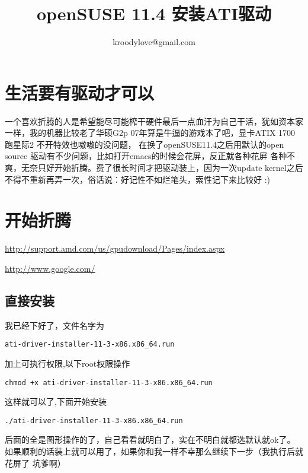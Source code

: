 \documentclass[adobefonts]{ctexart}
\title{\textbf{openSUSE 11.4 安装ATI驱动}}
\author{kroodylove@gmail.com}
\begin{document}
\maketitle
\tableofcontents

\newpage
\section{生活要有驱动才可以}
一个喜欢折腾的人是希望能尽可能榨干硬件最后一点血汗为自己干活，犹如资本家一样，我的机器比较老了华硕G2p 07年算是牛逼的游戏本了吧，显卡ATIX 1700跑星际2 不开特效也嗷嗷的没问题，
在换了openSUSE11.4之后用默认的open source 驱动有不少问题，比如打开emacs的时候会花屏，反正就各种花屏 各种不爽，无奈只好开始折腾。费了很长时间才把驱动装上，因为一次update kernel之后不得不重新再弄一次，俗话说：好记性不如烂笔头，索性记下来比较好 :)

\section{开始折腾}
\href{官网在此}{http://support.amd.com/us/gpudownload/Pages/index.aspx}

\href{google}{http://www.google.com/}

\subsection{直接安装}

我已经下好了，文件名字为
\begin{verbatim}
ati-driver-installer-11-3-x86.x86_64.run
\end{verbatim}
加上可执行权限,以下root权限操作
\begin{verbatim}
chmod +x ati-driver-installer-11-3-x86.x86_64.run
\end{verbatim}
这样就可以了,下面开始安装
\begin{verbatim}
./ati-driver-installer-11-3-x86.x86_64.run
\end{verbatim}
后面的全是图形操作的了，自己看看就明白了，实在不明白就都选默认就ok了。如果顺利的话装上就可以用了，如果你和我一样不幸那么继续下一步（我执行后就花屏了  坑爹啊）
\end{document}
